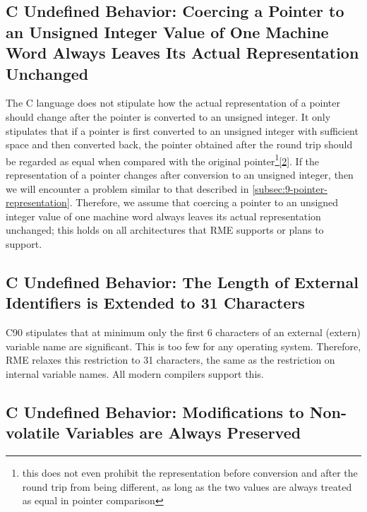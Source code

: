 \subsection{C Undefined Behavior: Coercing a Pointer to an Unsigned Integer Value of One Machine Word Always Leaves Its Actual Representation Unchanged}\label{subsec:9-pointer-integer-cast}

The C language does not stipulate how the actual representation of a pointer should change after the pointer is converted to an unsigned integer. It only stipulates that if a pointer is first converted to an unsigned integer with sufficient space and then converted back, the pointer obtained after the round trip should be regarded as equal when compared with the original pointer\footnote{this does not even prohibit the representation before conversion and after the round trip from being different, as long as the two values are always treated as equal in pointer comparison}\hyperref[cite:9-2]{{[}2{]}}. If the representation of a pointer changes after conversion to an unsigned integer, then we will encounter a problem similar to that described in \ref{subsec:9-pointer-representation}. Therefore, we assume that coercing a pointer to an unsigned integer value of one machine word always leaves its actual representation unchanged; this holds on all architectures that RME supports or plans to support.

\subsection{C Undefined Behavior: The Length of External Identifiers is Extended to 31 Characters}\label{subsec:9-external-identifier-length}

C90 stipulates that at minimum only the first 6 characters of an external (extern) variable name are significant. This is too few for any operating system. Therefore, RME relaxes this restriction to 31 characters, the same as the restriction on internal variable names. All modern compilers support this.

\subsection{C Undefined Behavior: Modifications to Non-volatile Variables are Always Preserved}\label{subsec:9-nonvolatile-write-preserved}

